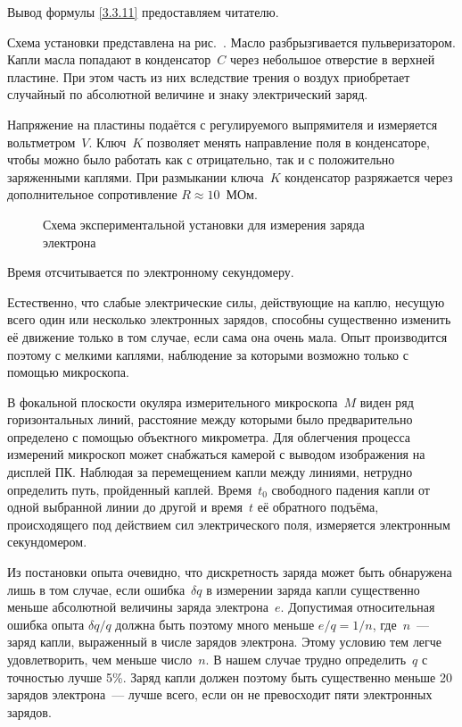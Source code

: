 Вывод формулы \eqref{3.3.11} предоставляем читателю.

\experiment Схема установки представлена на рис.~. Масло
разбрызгивается пульверизатором. Капли масла попадают в конденсатор~$C$ через
небольшое отверстие в верхней пластине. При этом часть из них вследствие трения
о воздух приобретает случайный по абсолютной величине и знаку электрический
заряд.

Напряжение на пластины подаётся с регулируемого выпрямителя и измеряется
вольтметром~$V$. Ключ~$K$ позволяет менять направление поля в конденсаторе,
чтобы можно было работать  как с отрицательно, так и с положительно заряженными
каплями. При размыкании ключа~$K$ конденсатор разряжается через дополнительное
сопротивление $R\approx 10$~МОм.
\begin{figure}[h!]
	\caption{Схема экспериментальной установки для измерения заряда электрона}
\end{figure}
Время отсчитывается по электронному секундомеру.

Естественно, что слабые электрические силы, действующие на каплю, несущую всего
один или несколько электронных зарядов, способны существенно изменить её
движение только в том случае, если сама она очень мала. Опыт производится
поэтому с мелкими каплями, наблюдение за которыми возможно только с помощью
микроскопа.

В фокальной плоскости окуляра измерительного микроскопа~$M$ виден ряд
горизонтальных линий, расстояние между которыми было предварительно определено с
помощью объектного микрометра. Для облегчения процесса измерений микроскоп может
снабжаться камерой с выводом изображения на дисплей ПК. Наблюдая за перемещением
капли между линиями, нетрудно определить путь, пройденный каплей. Время~$t_0$
свободного падения капли от одной выбранной линии до другой и время~$t$ её
обратного подъёма, происходящего под действием сил электрического поля,
измеряется электронным секундомером.

Из постановки опыта очевидно, что дискретность заряда может быть обнаружена лишь
в том случае, если ошибка~$\delta q$ в измерении заряда капли существенно меньше
абсолютной величины заряда электрона~$e$. Допустимая относительная ошибка опыта
$\delta q/q$ должна быть поэтому много меньше $e/q=1/n$, где~$n$~--- заряд
капли, выраженный в числе зарядов электрона. Этому условию тем легче
удовлетворить, чем меньше число~$n$. В нашем случае трудно определить~$q$ с
точностью лучше 5\%. Заряд капли должен поэтому быть существенно меньше 20
зарядов электрона~--- лучше всего, если он не превосходит пяти электронных
зарядов.

